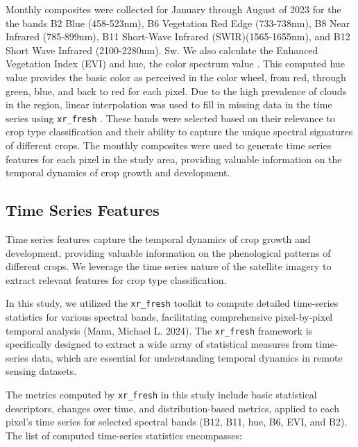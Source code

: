 \documentclass[journal]{IEEEtran}
\begin{document}
Monthly composites were collected for January through August of 2023 for the the bands B2 Blue (458-523nm), B6 Vegetation Red Edge (733-738nm), B8 Near Infrared (785-899nm), B11 Short-Wave Infrared (SWIR)(1565-1655nm), and B12 Short Wave Infrared (2100-2280nm). Sw. We also calculate the Enhanced Vegetation Index (EVI) and hue, the color spectrum value \cite{GoogleHSV}. This computed hue value provides the basic color as perceived in the color wheel, from red, through green, blue, and back to red for each pixel. Due to the high prevalence of clouds in the region, linear interpolation was used to fill in missing data in the time series using \texttt{xr\_fresh} \cite{xr_fresh_2021}. These bands were selected based on their relevance to crop type classification and their ability to capture the unique spectral signatures of different crops. The monthly composites were used to generate time series features for each pixel in the study area, providing valuable information on the temporal dynamics of crop growth and development.

\subsection{Time Series Features}

Time series features capture the temporal dynamics of crop growth and development, providing valuable information on the phenological patterns of different crops. We leverage the time series nature of the satellite imagery to extract relevant features for crop type classification.

In this study, we utilized the \texttt{xr\_fresh} toolkit to compute detailed time-series statistics for various spectral bands, facilitating comprehensive pixel-by-pixel temporal analysis (Mann, Michael L. 2024). The \texttt{xr\_fresh} framework is specifically designed to extract a wide array of statistical measures from time-series data, which are essential for understanding temporal dynamics in remote sensing datasets.

The metrics computed by \texttt{xr\_fresh} in this study include basic statistical descriptors, changes over time, and distribution-based metrics, applied to each pixel's time series for selected spectral bands (B12, B11, hue, B6, EVI, and B2). The list of computed time-series statistics encompasses:
\end{document}
